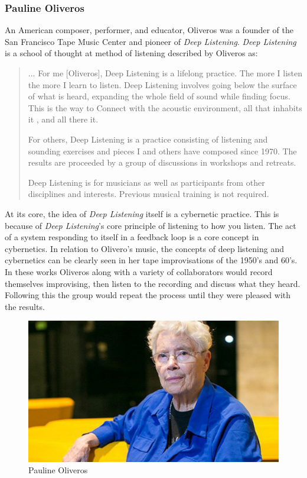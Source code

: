 \subsubsection{Pauline Oliveros} %
An American composer, performer, and educator, Oliveros was a founder of the San Francisco Tape Music Center and pioneer of\textit{ Deep Listening}\cite{HolmesElectronicMusic2020}. \textit{Deep Listening} is a school of thought at method of listening described by Oliveros as:

\begin{quote}
    ... For me [Oliveros], Deep Listening is a lifelong practice. The more I listen the more I learn to listen. Deep Listening involves going below the surface of what is heard, expanding the whole field of sound while finding focus. This is the way to Connect with the acoustic environment, all that inhabits it , and all there it.

    For others, Deep Listening is a practice consisting of listening and sounding exercises and pieces I and others have composed since 1970. The results are proceeded by a group of discussions in workshops and retreats. 

    Deep Listening is for musicians as well as participants from other disciplines and interests. Previous musical training is not required\cite{cultureandHumanity2002}.
\end{quote}

At its core, the idea of \textit{Deep Listening} itself is a cybernetic practice\cite{gordosOliverosCybernetics}. This is because of \textit{Deep Listening}'s core principle of listening to how you listen. The act of a system responding to itself in a feedback loop is a core concept in cybernetics. In relation to Olivero's music, the concepts of deep listening and cybernetics can be clearly seen in her tape improvisations of the 1950's and 60's. In these works Oliveros along with a variety of collaborators would record themselves improvising, then listen to the recording and discuss what they heard. Following this the group would repeat the process until they were pleased with the results\cite{gordosOliverosCybernetics}. 

\begin{figure}
    \centering %
    \includegraphics[scale=0.25]{diagrams/oliveros.jpg}
    \caption{Pauline Oliveros}
    \label{fig:oliverosHS}
\end{figure}

